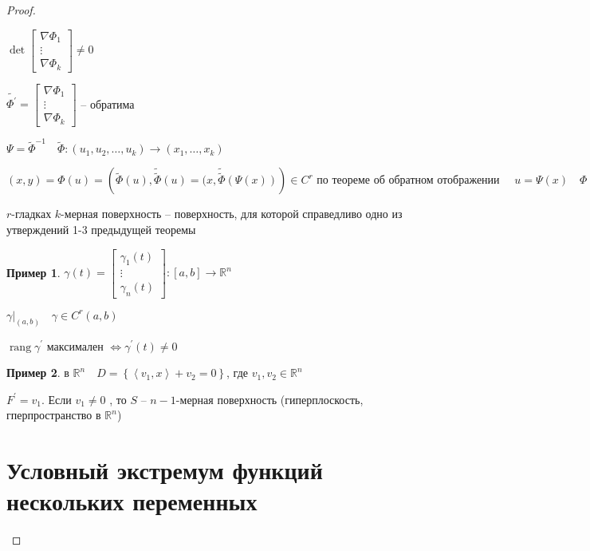 \documentclass{book}
\newcommand\R{\ensuremath{\mathbb{R}}}
\newcommand{\p}[1]{#1^{\prime}}
\newcommand{\tl}[1]{\widetilde{#1}}
\newcommand{\tll}[1]{\widetilde{\widetilde{#1}}}
\theoremstyle{definition}
\newtheorem*{example}{Пример}
\DeclareMathOperator{\rang}{rang}
\begin{document}
\begin{proof}
\begin{itemize}
            $\det \begin{bmatrix} \nabla \Phi_1\\ \vdots\\ \nabla \Phi_k \end{bmatrix} \neq 0$

            $\tl{\p \Phi} = \begin{bmatrix} \nabla \Phi_1 \\ \vdots \\ \nabla \Phi_k \end{bmatrix} $ -- обратима

            $\Psi  = \tl{\Phi}^{-1}\quad \tl \Phi :\left( u_1, u_2, \ldots, u_k \right) \to \left( x_1, \ldots, x_k \right) $

            $(x,y) = \Phi(u) = \left( \tl \Phi(u), \tll \Phi(u) = (x, \tll \Phi(\Psi(x))  \right) \in C^r \text{ по теореме об обратном отображении }\quad u = \Psi(x)\quad \Phi(u) = \Phi(\Psi(x))$

    \end{itemize}

    \begin{definition}
        $r$-гладках  $k$-мерная поверхность -- поверхность, для которой справедливо одно из утверждений 1-3 предыдущей теоремы
    \end{definition}

    \begin{example}
        $\gamma(t) = \begin{bmatrix} \gamma_1(t)\\ \vdots \\ \gamma_n(t) \end{bmatrix} :[a,b] \to \R^n$

        $\gamma |_{(a,b)}\quad \gamma\in C^r(a,b)$

        $\rang \p \gamma$ максимален  $\iff \p \gamma(t)\neq 0$
    \end{example}

    \begin{example}
        в  $\R^n\quad D = \left\{ \left<v_1, x \right> + v_2 = 0 \right\} $, где $v_1, v_2\in \R^n$

        $\p F = v_1$. Если $v_1\neq 0$ , то $S$ --  $n-1$-мерная поверхность (гиперплоскость, гперпространство в  $\R^n$)
    \end{example}

    \section{Условный экстремум функций нескольких переменных}


\end{proof}
\end{document}
